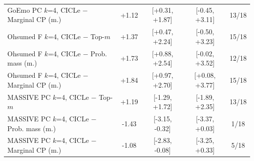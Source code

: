 \begin{tabular}{lcccc}
GoEmo PC $k$=4, CICLe $-$ Marginal CP (m.) & +1.12 & [+0.31, +1.87] & [-0.45, +3.11] & 13/18 \\
Ohsumed F $k$=4, CICLe $-$ Top-$m$ & +1.37 & [+0.47, +2.24] & [-0.50, +3.23] & 15/18 \\
Ohsumed F $k$=4, CICLe $-$ Prob. mass (m.) & +1.73 & [+0.88, +2.54] & [-0.02, +3.52] & 12/18 \\
Ohsumed F $k$=4, CICLe $-$ Marginal CP (m.) & +1.84 & [+0.97, +2.70] & [+0.08, +3.77] & 15/18 \\
MASSIVE PC $k$=4, CICLe $-$ Top-$m$ & +1.19 & [-1.29, +1.72] & [-1.89, +2.35] & 13/18 \\
MASSIVE PC $k$=4, CICLe $-$ Prob. mass (m.) & -1.43 & [-3.15, -0.32] & [-3.37, +0.03] & 1/18 \\
MASSIVE PC $k$=4, CICLe $-$ Marginal CP (m.) & -1.08 & [-2.83, -0.08] & [-3.25, +0.33] & 5/18 \\
\bottomrule
\end{tabular}
